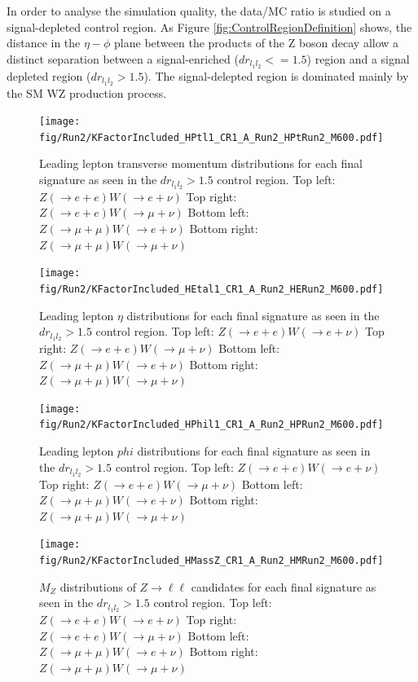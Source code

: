 In order to analyse the simulation quality, the data/MC ratio is studied on
a signal-depleted control region. As Figure \ref{fig:ControlRegionDefinition}
shows, the distance in the $\eta-\phi$ plane between the products
of the Z boson decay allow a distinct separation between a signal-enriched
($dr_{l_{1}l_{2}} <= 1.5$) region and a signal depleted region
($dr_{l_{1}l_{2}} > 1.5$). The signal-delepted region is dominated mainly by
the SM WZ production process.

\begin{figure}[tph]
  \centering
  \texttt{[image: fig/Run2/KFactorIncluded\_HPtl1\_CR1\_A\_Run2\_HPtRun2\_M600.pdf]}
  \caption{Leading lepton transverse momentum distributions for each final
    signature as seen in the $dr_{l_{1}l_{2}} > 1.5$ control region.
    Top left: $Z(\rightarrow e+e)W(\rightarrow e+\nu)$
    Top right: $Z(\rightarrow e+e)W(\rightarrow \mu+\nu)$
    Bottom left: $Z(\rightarrow \mu+\mu)W(\rightarrow e+\nu)$
    Bottom right: $Z(\rightarrow \mu+\mu)W(\rightarrow \mu+\nu)$}
  \label{fig:CR1_Run2_HPtl1}
\end{figure}

\begin{figure}[tph]
  \centering
  \texttt{[image: fig/Run2/KFactorIncluded\_HEtal1\_CR1\_A\_Run2\_HERun2\_M600.pdf]}
  \caption{Leading lepton $\eta$ distributions for each final
    signature as seen in the $dr_{l_{1}l_{2}} > 1.5$ control region.
    Top left: $Z(\rightarrow e+e)W(\rightarrow e+\nu)$
    Top right: $Z(\rightarrow e+e)W(\rightarrow \mu+\nu)$
    Bottom left: $Z(\rightarrow \mu+\mu)W(\rightarrow e+\nu)$
    Bottom right: $Z(\rightarrow \mu+\mu)W(\rightarrow \mu+\nu)$}
  \label{fig:CR1_Run2_HEtal1}
\end{figure}

\begin{figure}[tph]
  \centering
  \texttt{[image: fig/Run2/KFactorIncluded\_HPhil1\_CR1\_A\_Run2\_HPRun2\_M600.pdf]}
  \caption{Leading lepton $phi$ distributions for each final
    signature as seen in the $dr_{l_{1}l_{2}} > 1.5$ control region.
    Top left: $Z(\rightarrow e+e)W(\rightarrow e+\nu)$
    Top right: $Z(\rightarrow e+e)W(\rightarrow \mu+\nu)$
    Bottom left: $Z(\rightarrow \mu+\mu)W(\rightarrow e+\nu)$
    Bottom right: $Z(\rightarrow \mu+\mu)W(\rightarrow \mu+\nu)$}
  \label{fig:CR1_Run2_HPhil1}
\end{figure}

\begin{figure}[tph]
  \centering
  \texttt{[image: fig/Run2/KFactorIncluded\_HMassZ\_CR1\_A\_Run2\_HMRun2\_M600.pdf]}
  \caption{$M_{Z}$ distributions of $Z\rightarrow\ell\ell$ candidates for each final
    signature as seen in the $dr_{l_{1}l_{2}} > 1.5$ control region.
    Top left: $Z(\rightarrow e+e)W(\rightarrow e+\nu)$
    Top right: $Z(\rightarrow e+e)W(\rightarrow \mu+\nu)$
    Bottom left: $Z(\rightarrow \mu+\mu)W(\rightarrow e+\nu)$
    Bottom right: $Z(\rightarrow \mu+\mu)W(\rightarrow \mu+\nu)$}
  \label{fig:CR1_Run2_HMassZ}
\end{figure}

